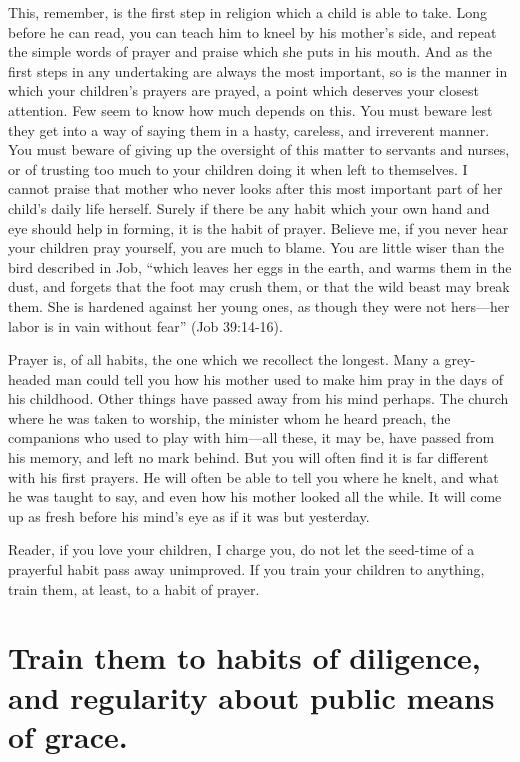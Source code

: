 \documentclass[
]{book}
\begin{document}
This, remember, is the first step in religion which a child is able to take. Long before he can read, you can teach him to kneel by his mother's side, and repeat the simple words of prayer and praise which she puts in his mouth. And as the first steps in any undertaking are always the most important, so is the manner in which your children's prayers are prayed, a point which deserves your closest attention. Few seem to know how much depends on this. You must beware lest they get into a way of saying them in a hasty, careless, and irreverent manner. You must beware of giving up the oversight of this matter to servants and nurses, or of trusting too much to your children doing it when left to themselves. I cannot praise that mother who never looks after this most important part of her child's daily life herself. Surely if there be any habit which your own hand and eye should help in forming, it is the habit of prayer. Believe me, if you never hear your children pray yourself, you are much to blame. You are little wiser than the bird described in Job, ``which leaves her eggs in the earth, and warms them in the dust, and forgets that the foot may crush them, or that the wild beast may break them. She is hardened against her young ones, as though they were not hers---her labor is in vain without fear'' (Job 39:14-16).

Prayer is, of all habits, the one which we recollect the longest. Many a grey-headed man could tell you how his mother used to make him pray in the days of his childhood. Other things have passed away from his mind perhaps. The church where he was taken to worship, the minister whom he heard preach, the companions who used to play with him---all these, it may be, have passed from his memory, and left no mark behind. But you will often find it is far different with his first prayers. He will often be able to tell you where he knelt, and what he was taught to say, and even how his mother looked all the while. It will come up as fresh before his mind's eye as if it was but yesterday.

Reader, if you love your children, I charge you, do not let the seed-time of a prayerful habit pass away unimproved. If you train your children to anything, train them, at least, to a habit of prayer.

\hypertarget{train-them-to-habits-of-diligence-and-regularity-about-public-means-of-grace.}{%
\chapter{Train them to habits of diligence, and regularity about public means of grace.}\label{train-them-to-habits-of-diligence-and-regularity-about-public-means-of-grace.}}
\end{document}
